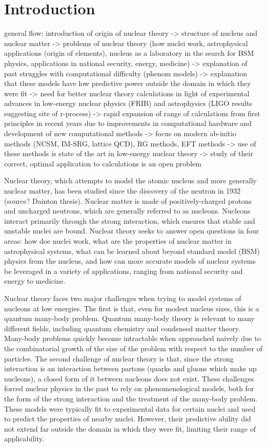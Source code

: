 \chapter{Introduction}

general flow: introduction of origin of nuclear theory -> structure of nucleus and nuclear matter -> problems of nuclear theory (how nuclei work, astrophysical applications (origin of elements), nucleus as a laboratory in the search for BSM physics, applications in national security, energy, medicine) -> explanation of past struggles with computational difficulty (phenom models) -> explanation that these models have low predictive power outside the domain in which they were fit -> need for better nuclear theory calculations in light of experimental advances in low-energy nuclear physics (FRIB) and astrophysics (LIGO results suggesting site of r-process) -> rapid expansion of range of calculations from first principles in recent years due to improvements in computational hardware and development of new computational methods -> focus on modern ab-initio methods (NCSM, IM-SRG, lattice QCD), RG methods, EFT methods -> use of these methods is state of the art in low-energy nuclear theory -> study of their correct, optimal application to calculations is an open problem


Nuclear theory, which attempts to model the atomic nucleus and more generally nuclear matter, has been studied since the discovery of the neutron in 1932 (source? Dainton thesis). Nuclear matter is made of positively-charged protons and uncharged neutrons, which are generally referred to as nucleons. Nucleons interact primarily through the strong interaction, which ensures that stable and unstable nuclei are bound. Nuclear theory seeks to answer open questions in four areas: how doe nuclei work, what are the properties of nuclear matter in astrophysical systems, what can be learned about beyond standard model (BSM) physics from the nucleus, and how can more accurate models of nuclear systems be leveraged in a variety of applications, ranging from national security and energy to medicine.

Nuclear theory faces two major challenges when trying to model systems of nucleons at low energies. The first is that, even for modest nucleus sizes, this is a quantum many-body problem. Quantum many-body theory is relevant to many different fields, including quantum chemistry and condensed matter theory. Many-body problems quickly become intractable when approached naively due to the combinatorial growth of the size of the problem with respect to the number of particles. The second challenge of nuclear theory is that, since the strong interaction is an interaction between partons (quarks and gluons which make up nucleons), a closed form of it between nucleons does not exist. These challenges forced nuclear physics in the past to rely on phenomenological models, both for the form of the strong interaction and the treatment of the many-body problem. These models were typically fit to experimental data for certain nuclei and used to predict the properties of nearby nuclei. However, their predictive ability did not extend far outside the domain in which they were fit, limiting their range of applicability.

